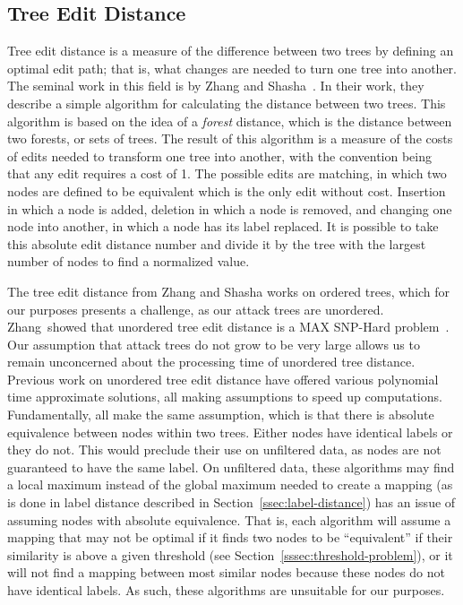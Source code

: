 \subsection{Tree Edit Distance}
\label{ssec:ted}

Tree edit distance is a measure of the difference between two trees by defining an optimal edit path; that is, what changes are needed to turn one tree into another. The seminal work in this field is by Zhang and Shasha~\cite{Zhang_Shasha_1989}. In their work, they describe a simple algorithm for calculating the distance between two trees. This algorithm is based on the idea of a \textit{forest} distance, which is the distance between two forests, or sets of trees. The result of this algorithm is a measure of the costs of edits needed to transform one tree into another, with the convention being that any edit requires a cost of 1. The possible edits are matching, in which two nodes are defined to be equivalent which is the only edit without cost. Insertion in which a node is added, deletion in which a node is removed, and changing one node into another, in which a node has its label replaced. It is possible to take this absolute edit distance number and divide it by the tree with the largest number of nodes to find a normalized value.

The tree edit distance from Zhang and Shasha works on ordered trees, which for our purposes presents a challenge, as our attack trees are unordered. Zhang~\etal showed that unordered tree edit distance is a MAX SNP-Hard problem~\cite{zhang_max_1994}. Our assumption that attack trees do not grow to be very large allows us to remain unconcerned about the processing time of unordered tree distance. Previous work on unordered tree edit distance have offered various polynomial time approximate solutions, all making assumptions to speed up computations. Fundamentally, all make the same assumption, which is that there is absolute equivalence between nodes within two trees. Either nodes have identical labels or they do not. This would preclude their use on unfiltered data, as nodes are not guaranteed to have the same label. On unfiltered data, these algorithms may find a local maximum instead of the global maximum needed to create a mapping (as is done in label distance described in Section~\ref{ssec:label-distance}) has an issue of assuming nodes with absolute equivalence. That is, each algorithm will assume a mapping that may not be optimal if it finds two nodes to be ``equivalent'' if their similarity is above a given threshold (see Section~\ref{sssec:threshold-problem}), or it will not find a mapping between most similar nodes because these nodes do not have identical labels. As such, these algorithms are unsuitable for our purposes.



